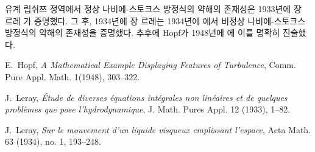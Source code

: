 \documentclass{oblivoir}
\begin{document}
유계 립쉬쯔 정역에서 정상 나비에-스토크스 방정식의 약해의 존재성은 1933년에 장 르레 \cite{J}가 증명했다. 그 후, 1934년에 장 르레는 1934년에 \cite{J2}에서 비정상 나비에-스토크스 방정식의 약해의 존재성을 증명했다. 추후에 Hopf가 1948년에 \cite{H}에 이를 명확히 진술했다. 

\begin{thebibliography}{9}
 E.~Hopf, \textit{A Mathematical Example Displaying Features of Turbulence}, Comm. Pure Appl. Math. 1(1948), 303--322.

  J.~Leray, \textit{Étude de diverses équations intégrales non linéaires et de quelques problèmes que pose l'hydrodynamique}, J. Math. Pures Appl. 12 (1933), 1--82.

 J.~Leray, \textit{Sur le mouvement d'un liquide visqueux emplissant l'espace}, Acta Math. 63 (1934), no. 1, 193--248.
\end{thebibliography}
\end{document}
